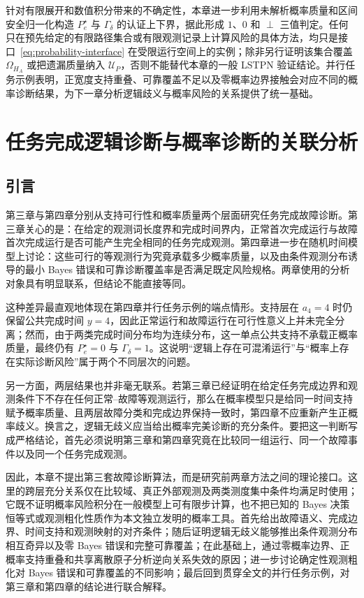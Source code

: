 \documentclass[master,fontset=ubuntu]{shnuthesis}
\DeclareRobustCommand{\probstatus}[1]{\ensuremath{#1}}
\theoremstyle{definition}
\begin{document}
针对有限展开和数值积分带来的不确定性，本章进一步利用未解析概率质量和区间安全归一化构造 \(P_e^\star\) 与 \(\Gamma_\delta\) 的认证上下界，据此形成 \probstatus{1}、\probstatus{0} 和 \probstatus{\perp} 三值判定。任何只在预先给定的有限路径集合或有限观测记录上计算风险的具体方法，均只是接口~\eqref{eq:probability-interface} 在受限运行空间上的实例；除非另行证明该集合覆盖 \(\Omega_{H_A}\) 或把遗漏质量纳入 \(\mathcal U_P\)，否则不能替代本章的一般 LSTPN 验证结论。并行任务示例表明，正宽度支持重叠、可靠覆盖不足以及零概率边界接触会对应不同的概率诊断结果，为下一章分析逻辑歧义与概率风险的关系提供了统一基础。

\chapter{任务完成逻辑诊断与概率诊断的关联分析}

\section{引言}

第三章与第四章分别从支持可行性和概率质量两个层面研究任务完成故障诊断。第三章关心的是：在给定的观测词长度界和完成时间界内，正常首次完成运行与故障首次完成运行是否可能产生完全相同的任务完成观测。第四章进一步在随机时间模型上讨论：这些可行的等观测行为究竟承载多少概率质量，以及由条件观测分布诱导的最小 Bayes 错误和可靠诊断覆盖率是否满足既定风险规格。两章使用的分析对象具有明显联系，但结论不能直接等同。

这种差异最直观地体现在第四章并行任务示例的端点情形。支持层在 \(a_4=4\) 时仍保留公共完成时间 \(y=4\)，因此正常运行和故障运行在可行性意义上并未完全分离；然而，由于两类完成时间分布均为连续分布，这一单点公共支持不承载正概率质量，最终仍有 \(P_e^\star=0\) 与 \(\Gamma_\delta=1\)。这说明“逻辑上存在可混淆运行”与“概率上存在实际诊断风险”属于两个不同层次的问题。

另一方面，两层结果也并非毫无联系。若第三章已经证明在给定任务完成边界和观测条件下不存在任何正常--故障等观测运行，那么在概率模型只是给同一时间支持赋予概率质量、且两层故障分类和完成边界保持一致时，第四章不应重新产生正概率歧义。换言之，逻辑无歧义应当给出概率完美诊断的充分条件。要把这一判断写成严格结论，首先必须说明第三章和第四章究竟在比较同一组运行、同一个故障事件以及同一个任务完成观测。

因此，本章不提出第三套故障诊断算法，而是研究前两章方法之间的理论接口。这里的跨层充分关系仅在比较域、真正外部观测及两类测度集中条件均满足时使用；它既不证明概率风险积分在一般模型上可有限步计算，也不把已知的 Bayes 决策恒等式或观测粗化性质作为本文独立发明的概率工具。首先给出故障语义、完成边界、时间支持和观测映射的对齐条件；随后证明逻辑无歧义能够推出条件观测分布相互奇异以及零 Bayes 错误和完整可靠覆盖；在此基础上，通过零概率边界、正概率支持重叠和共享离散原子分析逆向关系失效的原因；进一步讨论确定性观测粗化对 Bayes 错误和可靠覆盖的不同影响；最后回到贯穿全文的并行任务示例，对第三章和第四章的结论进行联合解释。
\end{document}
